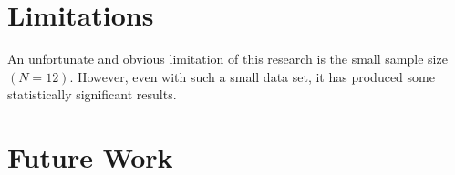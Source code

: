 \section{Limitations}
    An unfortunate and obvious limitation of this research is the small sample size $(N=12)$. 
    However, even with such a small data set, it has produced some statistically significant results. 



\section{Future Work}

